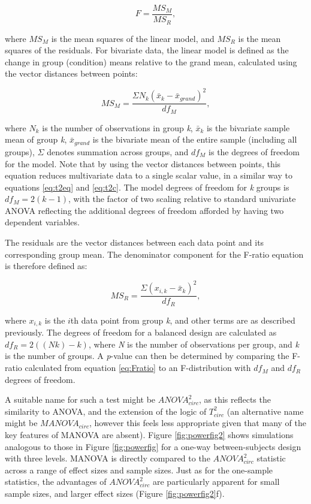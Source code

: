 \documentclass[]{article}
\begin{document}
\begin{equation}
\label{eq:Fratio}
F = \frac{MS_M}{MS_R},
\end{equation}

where \(MS_M\) is the mean squares of the linear model, and \(MS_R\) is the mean squares of the residuals. For bivariate data, the linear model is defined as the change in group (condition) means relative to the grand mean, calculated using the vector distances between points:

\begin{equation}
\label{eq:MSM}
MS_M = \frac{\Sigma N_k (\bar{x}_k - \bar{x}_{grand})^2}{df_M},
\end{equation}

where \(N_k\) is the number of observations in group \emph{k}, \(\bar{x}_k\) is the bivariate sample mean of group \emph{k}, \(\bar{x}_{grand}\) is the bivariate mean of the entire sample (including all groups), \(\Sigma\) denotes summation across groups, and \(df_M\) is the degrees of freedom for the model. Note that by using the vector distances between points, this equation reduces multivariate data to a single scalar value, in a similar way to equations \eqref{eq:t2eq} and \eqref{eq:t2c}. The model degrees of freedom for \emph{k} groups is \(df_M = 2(k-1)\), with the factor of two scaling relative to standard univariate ANOVA reflecting the additional degrees of freedom afforded by having two dependent variables.

The residuals are the vector distances between each data point and its corresponding group mean. The denominator component for the F-ratio equation is therefore defined as:

\begin{equation}
\label{eq:MSR}
MS_R = \frac{\Sigma (x_{i,k} - \bar{x}_k)^2}{df_R},
\end{equation}

where \(x_{i,k}\) is the \(i\)th data point from group \emph{k}, and other terms are as described previously. The degrees of freedom for a balanced design are calculated as \(df_R = 2((Nk)-k)\), where \emph{N} is the number of observations per group, and \emph{k} is the number of groups. A \emph{p}-value can then be determined by comparing the F-ratio calculated from equation \eqref{eq:Fratio} to an F-distribution with \(df_M\) and \(df_R\) degrees of freedom.

A suitable name for such a test might be \({ANOVA}^2_{circ}\), as this reflects the similarity to ANOVA, and the extension of the logic of \(T^2_{circ}\) (an alternative name might be \(MANOVA_{circ}\), however this feels less appropriate given that many of the key features of MANOVA are absent). Figure \ref{fig:powerfig2} shows simulations analogous to those in Figure \ref{fig:powerfig} for a one-way between-subjects design with three levels. MANOVA is directly compared to the \({ANOVA}^2_{circ}\) statistic across a range of effect sizes and sample sizes. Just as for the one-sample statistics, the advantages of \({ANOVA}^2_{circ}\) are particularly apparent for small sample sizes, and larger effect sizes (Figure \ref{fig:powerfig2}f).
\end{document}

